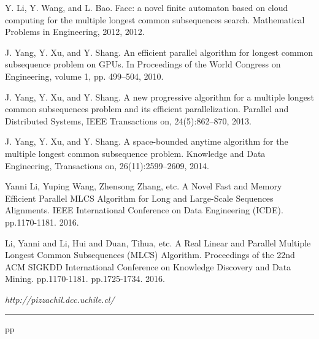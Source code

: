 \documentclass{article}
\begin{document}
\begin{thebibliography}{99}
 Y. Li, Y. Wang, and L. Bao. Facc: a novel finite
  automaton based on cloud computing for the multiple longest common
  subsequences search. Mathematical Problems in Engineering, 2012,
  2012.

 J. Yang, Y. Xu, and Y. Shang. An efficient parallel
  algorithm for longest common subsequence problem on GPUs. In
  Proceedings of the World Congress on Engineering, volume 1, pp.
  499–504, 2010.

 J. Yang, Y. Xu, and Y. Shang. A new progressive
  algorithm for a multiple longest common subsequences problem and its
  efficient parallelization. Parallel and Distributed Systems, IEEE
  Transactions on, 24(5):862–870, 2013.

 J. Yang, Y. Xu, and Y. Shang. A space-bounded
  anytime algorithm for the multiple longest common subsequence
  problem. Knowledge and Data Engineering, Transactions on,
  26(11):2599–2609, 2014.

 Yanni Li, Yuping Wang, Zhensong Zhang, etc. A Novel
  Fast and Memory Efficient Parallel MLCS Algorithm for Long and
  Large-Scale Sequences Alignments.  IEEE International Conference on
  Data Engineering (ICDE). pp.1170-1181. 2016.

 Li, Yanni and Li, Hui and Duan, Tihua, etc. A Real Linear
and Parallel Multiple Longest Common Subsequences (MLCS)
Algorithm. Proceedings of the 22nd ACM SIGKDD International Conference
on Knowledge Discovery and Data
Mining. pp.1170-1181. pp.1725-1734. 2016.




 {\it http://pizzachil.dcc.uchile.cl/}

\end{thebibliography}  


\vspace*{-0.01in}
\noindent
\rule{12.6cm}{.1mm}
pp
\end{document}
